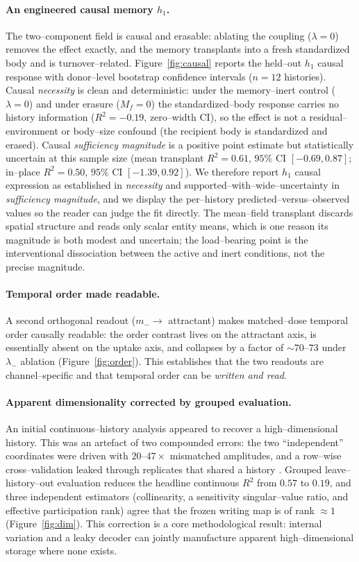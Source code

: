 \documentclass[11pt]{article}
\begin{document}
\paragraph{An engineered causal memory $h_1$.} The two--component field is causal and erasable: ablating the
coupling ($\lambda=0$) removes the effect exactly, and the memory transplants into a fresh standardized body and is
turnover--related. Figure~\ref{fig:causal} reports the held--out $h_1$ causal response with donor--level bootstrap confidence intervals ($n=12$ histories). Causal \emph{necessity} is clean and deterministic: under the memory--inert control ($\lambda=0$) and under erasure ($M_f=0$) the standardized--body response carries no history information ($R^2=-0.19$, zero--width CI), so the effect is not a residual--environment or body--size confound (the recipient body is standardized and erased). Causal \emph{sufficiency magnitude} is a positive point estimate but statistically uncertain at this sample size (mean transplant $R^2=0.61$, $95\%$ CI $[-0.69,0.87]$; in--place $R^2=0.50$, $95\%$ CI $[-1.39,0.92]$). We therefore report $h_1$ causal expression as established in \emph{necessity} and supported--with--wide--uncertainty in \emph{sufficiency magnitude}, and we display the per--history predicted--versus--observed values so the reader can judge the fit directly. The mean--field transplant discards spatial structure and reads only scalar entity means, which is one reason its magnitude is both modest and uncertain; the load--bearing point is the interventional dissociation between the active and inert conditions, not the precise magnitude.

\paragraph{Temporal order made readable.} A second orthogonal readout ($m_-\!\to$ attractant) makes matched--dose
temporal order causally readable: the order contrast lives on the attractant axis, is essentially absent on the
uptake axis, and collapses by a factor of $\sim$$70$--$73$ under $\lambda_-$ ablation (Figure~\ref{fig:order}). This
establishes that the two readouts are channel--specific and that temporal order can be \emph{written and read}.

\paragraph{Apparent dimensionality corrected by grouped evaluation.} An initial continuous--history analysis
appeared to recover a high--dimensional history. This was an artefact of two compounded errors: the two ``independent''
coordinates were driven with $20$--$47\times$ mismatched amplitudes, and a row--wise cross--validation leaked
through replicates that shared a history \citep{kaufman2012}. Grouped leave--history--out evaluation reduces the
headline continuous $R^2$ from $0.57$ to $0.19$, and three independent estimators (collinearity, a
sensitivity singular--value ratio, and effective participation rank) agree that the frozen writing map is of rank
$\approx1$ (Figure~\ref{fig:dim}). This correction is a core methodological result: internal variation and a leaky
decoder can jointly manufacture apparent high--dimensional storage where none exists.
\end{document}
